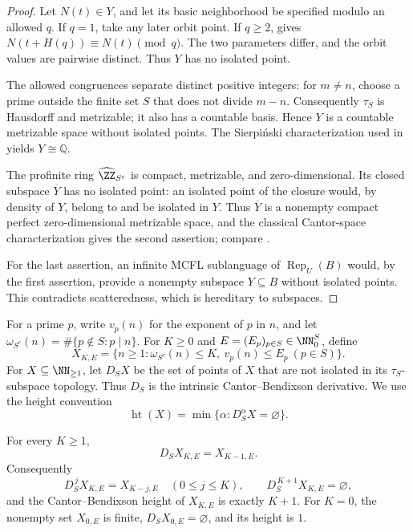 \begin{proof}
  Let \(N(t)\in Y\), and let its basic neighborhood be specified modulo
  an allowed \(q\). If \(q=1\), take any later orbit point. If \(q\ge2\),
     gives
    \(N(t+H(q))\equiv N(t)\pmod q\). The two parameters differ, and the
    orbit values are pairwise distinct. Thus \(Y\) has no isolated point.

  The allowed congruences separate distinct positive integers: for
  \(m\ne n\), choose a prime outside the finite set \(S\) that does not
  divide \(m-n\). Consequently \(\tau_S\) is Hausdorff and metrizable;
  it also has a countable basis. Hence \(Y\) is a countable metrizable
  space without isolated points. The Sierpi\'nski characterization used
  in \cite[Theorem~2.4]{Broughan2003} yields \(Y\cong\mathbb Q\).

  The profinite ring \(\widehat{\ZZ}_{S^c}\) is compact, metrizable, and
  zero-dimensional. Its closed subspace \(\overline Y\) has no isolated
  point: an isolated point of the closure would, by density of \(Y\),
  belong to and be isolated in \(Y\). Thus \(\overline Y\) is a nonempty
  compact perfect zero-dimensional metrizable space, and the classical
  Cantor-space characterization gives the second assertion; compare
  \cite[Corollary~3.1]{Broughan2003}.

  For the last assertion, an infinite MCFL sublanguage of
  \(\operatorname{Rep}_U(B)\) would, by the first assertion, provide a
  nonempty subspace \(Y\subseteq B\) without isolated points. This
  contradicts scatteredness, which is hereditary to subspaces.
\end{proof}

For a prime \(p\), write \(v_p(n)\) for the exponent of \(p\) in \(n\),
and let \(\omega_{S^c}(n)=\#\{p\notin S:p\mid n\}\).
For \(K\ge0\) and \(E=(E_p)_{p\in S}\in\NN_0^S\), define
\[
  X_{K,E}=\{n\ge1:\omega_{S^c}(n)\le K,
               \ v_p(n)\le E_p\ (p\in S)\}.
\]
For \(X\subseteq\NN_{\ge1}\), let \(D_SX\) be the set of points of \(X\)
that are not isolated in its \(\tau_S\)-subspace topology. Thus \(D_S\)
is the intrinsic Cantor--Bendixson derivative. We use the height convention
\[
  \operatorname{ht}(X)=\min\{\alpha:D_S^\alpha X=\varnothing\}.
\]

\begin{proposition}
  \label{prop:local-prime-factor-cb-rank}
  For every \(K\ge1\),
  \[
    D_SX_{K,E}=X_{K-1,E}.
  \]
  Consequently
  \[
    D_S^{\,j}X_{K,E}=X_{K-j,E}\quad(0\le j\le K),
    \qquad D_S^{\,K+1}X_{K,E}=\varnothing,
  \]
  and the Cantor--Bendixson height of \(X_{K,E}\) is exactly \(K+1\).
  For \(K=0\), the nonempty set \(X_{0,E}\) is finite,
  \(D_SX_{0,E}=\varnothing\), and its height is \(1\).
\end{proposition}


